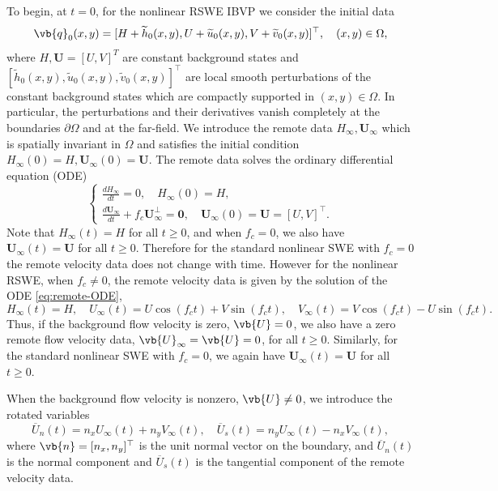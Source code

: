 \documentclass{article}
\numberwithin{equation}{section}
\theoremstyle{definition}
\begin{document}
%
To begin, at $t=0$, for the nonlinear RSWE IBVP we consider the initial data
$$
\vb{q}_0(x,y) = [H+\widetilde{h}_0(x,y), U+\widetilde{u}_0(x,y), V+\widetilde{v}_0(x,y)]^\top, \quad (x,y) \in \Omega,
$$
where $H, \mathbf{U} = [U, V]^T$ are constant background states and $[\widetilde{h}_0(x,y), \widetilde{u}_0(x,y), \widetilde{v}_0(x,y)]^\top$ are  local smooth perturbations of the constant  background states which are compactly supported in $(x,y) \in \Omega$. In particular, the perturbations and their derivatives vanish completely at the  boundaries $\partial \Omega$ and at the far-field. We introduce the remote data ${H}_{\infty}, \mathbf{U}_{\infty}$ which is spatially invariant in $\Omega$ and satisfies the initial condition ${H}_{\infty}(0)=H, \mathbf{U}_{\infty}(0) = \mathbf{U}$.
The remote data solves the ordinary differential equation (ODE)
\begin{equation}\label{eq:remote-ODE}
    \begin{cases}
        \frac{d {H}_{\infty}}{d t} =0,\quad {H}_{\infty}(0) ={H},
        \\
 \frac{d \mathbf{U}_{\infty}}{d t} + f_c \mathbf{U}_{\infty}^\perp = \mathbf{0}, \quad \mathbf{U}_{\infty}(0) = \mathbf{U}= [U, V]^\top.
    \end{cases}
\end{equation}
Note that ${H}_{\infty}(t) = {H}$ for all $t \ge 0$, and  when $f_c=0$, we also have $\mathbf{U}_{\infty}(t) = \mathbf{U}$ for all $t \ge 0$.
Therefore for the standard nonlinear SWE with $f_c=0$ the remote velocity data does not change with time.
However for the nonlinear RSWE, when $f_c \ne 0$, the remote velocity data is given by the solution of the ODE \eqref{eq:remote-ODE}, 
$$
{H}_{\infty}(t) = {H}, \quad U_{\infty}(t) = U\cos(f_ct) + V\sin(f_ct), 
\quad
V_{\infty}(t) = V\cos(f_ct) - U\sin(f_ct).
$$
Thus, if the background flow velocity is zero, $\vb{U} = 0$, we also have a zero remote flow velocity data, $\vb{U}_{\infty}= \vb{U}=0$, for all $t\ge 0$. Similarly, for the standard nonlinear SWE with $f_c=0$, we again have $\mathbf{U}_{\infty}(t) = \mathbf{U}$ for all $t \ge 0$.

When the background flow velocity is nonzero, $\vb{U} \ne 0$, we introduce the rotated variables
$$
\overline{U}_n(t) = n_xU_{\infty}(t) + n_yV_{\infty}(t), 
\quad 
\overline{U}_s(t) = n_yU_{\infty}(t) - n_xV_{\infty}(t),
$$
where $\vb{n} = [n_x, n_y]^\top$ is the unit normal vector on the boundary, and $\overline{U}_n(t)$ is the normal component and $\overline{U}_s(t)$ is the tangential component of the remote velocity data.
\end{document}
